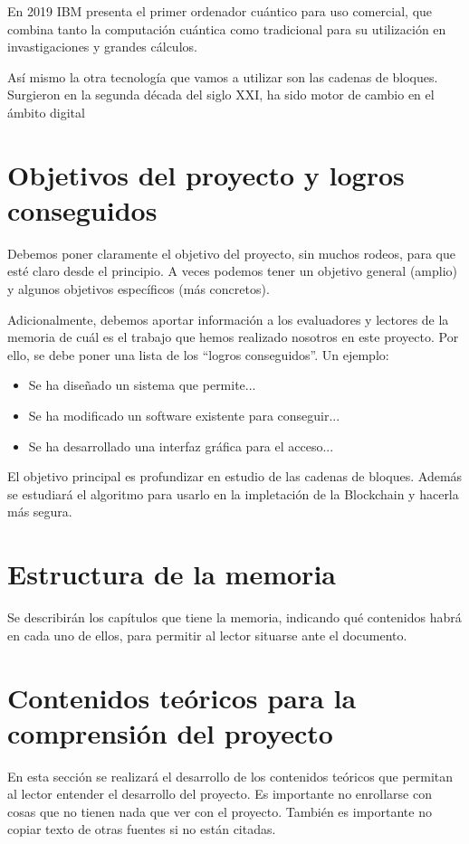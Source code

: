 En 2019 IBM presenta el primer ordenador cuántico para uso comercial, que combina tanto la computación cuántica como tradicional para su utilización en invastigaciones y grandes cálculos.



Así mismo la otra tecnología que vamos a utilizar son las cadenas de bloques. Surgieron en la segunda década del siglo XXI, ha sido motor de cambio en el ámbito digital 





\section{Objetivos del proyecto y logros conseguidos}

Debemos poner claramente el objetivo del proyecto, sin muchos rodeos, para que esté claro desde el principio. A veces podemos tener un objetivo general (amplio) y algunos objetivos específicos (más concretos). 

Adicionalmente, debemos aportar información a los evaluadores y lectores de la memoria de cuál es el trabajo que hemos realizado nosotros en este proyecto. Por ello, se debe poner una lista de los ``logros conseguidos''. Un ejemplo: 

\begin{itemize}
	\item Se ha diseñado un sistema que permite...
	\item Se ha modificado un software existente para conseguir...
	\item Se ha desarrollado una interfaz gráfica para el acceso...
\end{itemize}


El objetivo principal es profundizar en estudio de las cadenas de bloques. Además se estudiará el algoritmo para usarlo en la impletación de la Blockchain y hacerla más segura.


\section{Estructura de la memoria}
Se describirán los capítulos que tiene la memoria, indicando qué contenidos habrá en cada uno de ellos, para permitir al lector situarse ante el documento. 


\section{Contenidos teóricos para la comprensión del proyecto}
En esta sección se realizará el desarrollo de los contenidos teóricos que permitan al lector entender el desarrollo del proyecto. Es importante no enrollarse con cosas que no tienen nada que ver con el proyecto. También es importante no copiar texto de otras fuentes si no están citadas.


